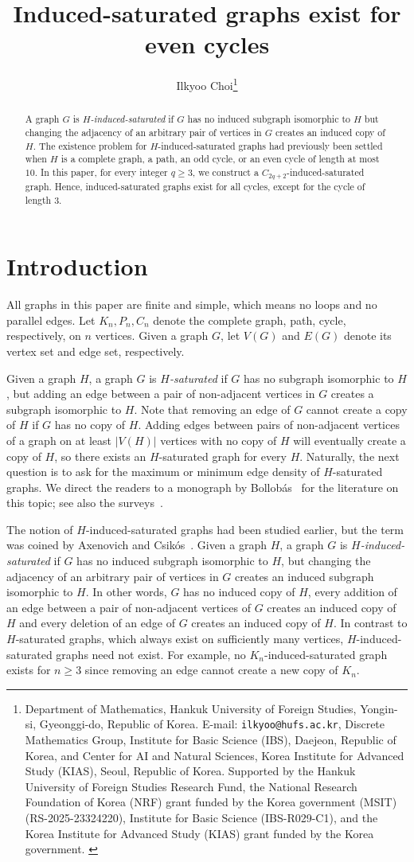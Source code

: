\documentclass[11pt]{article}
\title{Induced-saturated graphs exist for even cycles}
\author{
{{Ilkyoo Choi}}\thanks{
\footnotesize {Department of Mathematics, Hankuk University of Foreign Studies, Yongin-si, Gyeonggi-do, Republic of Korea.
 E-mail: \texttt {ilkyoo@hufs.ac.kr},
  Discrete Mathematics Group, Institute for Basic Science (IBS), Daejeon, Republic of Korea, and Center for AI and Natural Sciences, Korea Institute for Advanced Study (KIAS), Seoul, Republic of Korea.
Supported by the Hankuk University of Foreign Studies Research Fund, the National Research Foundation of Korea (NRF) grant funded by the Korea government (MSIT) (RS-2025-23324220), Institute for Basic Science (IBS-R029-C1), and the Korea Institute for Advanced Study (KIAS) grant funded by the Korea government.
}}}
\date{}
\theoremstyle{definition}
\theoremstyle{remark}
\begin{document}
\maketitle

\begin{abstract}
A graph $G$ is \emph{$H$-induced-saturated} if $G$ has no induced subgraph isomorphic to $H$ but changing the adjacency of an arbitrary pair of vertices in $G$ creates an induced copy of $H$. 
The existence problem for $H$-induced-saturated graphs had previously been settled when $H$ is a complete graph, a path, an odd cycle, or an even cycle of length at most $10$. 
In this paper, for every integer $q\ge3$, we construct a $C_{2q+2}$-induced-saturated graph.
Hence, induced-saturated graphs exist for all cycles, except for the cycle of length 3.
\end{abstract}

\section{Introduction}

All graphs in this paper are finite and simple, which means no loops and no parallel edges. 
Let $K_n, P_n, C_n$ denote the complete graph, path, cycle, respectively, on $n$ vertices. 
Given a graph $G$, let $V(G)$ and $E(G)$ denote its vertex set and edge set, respectively. 

Given a graph $H$, a graph $G$ is \emph{$H$-saturated} if $G$ has no subgraph isomorphic to $H$, but adding an edge between a pair of non-adjacent vertices in $G$ creates a subgraph isomorphic to $H$. 
Note that removing an edge of $G$ cannot create a copy of $H$ if $G$ has no copy of $H$. 
Adding edges between pairs of non-adjacent vertices of a graph on at least $|V(H)|$ vertices with no copy of $H$ will eventually create a copy of $H$, so there exists an $H$-saturated graph for every $H$. 
Naturally, the next question is to ask for the maximum or minimum edge density of $H$-saturated graphs.
We direct the readers to a monograph by Bollob\'as~\cite{2004Bollobas} for the literature on this topic; see also the surveys~\cite{2011CuFaFaSc,2013FuSi}. 

The notion of $H$-induced-saturated graphs had been studied earlier, but the term was coined by Axenovich and Csik\'{o}s~\cite{2019AxCs}. 
Given a graph $H$, a graph $G$ is \emph{$H$-induced-saturated} if $G$ has no induced subgraph isomorphic to $H$, but changing the adjacency of an arbitrary pair of vertices in $G$ creates an induced subgraph isomorphic to $H$. 
In other words, $G$ has no induced copy of $H$, every addition of an edge between a pair of non-adjacent vertices of $G$ creates an induced copy of $H$ and every deletion of an edge of $G$ creates an induced copy of $H$.
In contrast to $H$-saturated graphs, which always exist on sufficiently many vertices, $H$-induced-saturated graphs need not exist. 
For example, no $K_n$-induced-saturated graph exists for $n\geq 3$ since removing an edge cannot create a new copy of $K_n$. 
\end{document}
